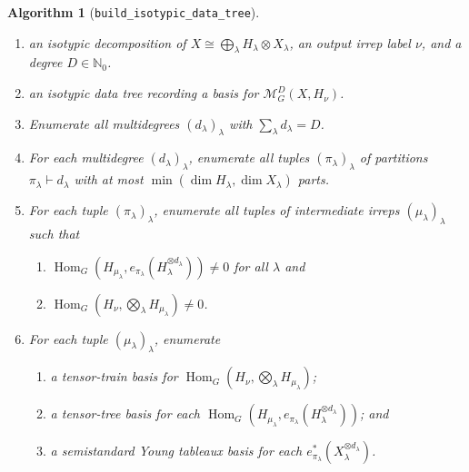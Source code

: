 \documentclass[11pt]{article}
\newcommand{\dsN}{\mathbb{N}}
\newcommand{\scM}{\mathcal{M}}
\newcommand{\HomG}[2]{\operatorname{Hom}_G\!\left(#1,#2\right)}
\newtheorem{algorithm}[theorem]{Algorithm}
\theoremstyle{definition}
\begin{document}
\begin{algorithm}[\texttt{build\_isotypic\_data\_tree}]\label{alg:build-isotypic-data-tree}

  \phantom{}

  \begin{enumerate}[label=\textbf{Step \arabic*.},ref=\arabic*,leftmargin=2.8cm]

    \item[\textbf{Input:}] an isotypic decomposition of $X\cong \bigoplus_\lambda H_\lambda\otimes X_\lambda$, an output irrep label $\nu$, and a degree $D \in \dsN_0$.

    \item[\textbf{Output:}] an isotypic data tree recording a basis for $\scM_G^D(X,H_\nu)$.

    \item \label{alg:build-isotypic-data-tree:step-multidegrees} Enumerate all multidegrees $(d_\lambda)_\lambda$ with $\sum_\lambda d_\lambda=D$.

    \item \label{alg:build-isotypic-data-tree:step-partitions} For each multidegree $(d_\lambda)_\lambda$, enumerate all tuples $(\pi_\lambda)_\lambda$ of partitions $\pi_\lambda\vdash d_\lambda$ with at most $\min(\dim H_\lambda,\dim X_\lambda)$ parts.

    \item \label{alg:build-isotypic-data-tree:step-intermediate-irreps} For each tuple $(\pi_\lambda)_\lambda$, enumerate all tuples of intermediate irreps $(\mu_\lambda)_\lambda$ such that
    \begin{enumerate}[label=\textup{(\alph*)},ref=\theenumi(\alph*),leftmargin=2.2em]
      \item \label{alg:build-isotypic-data-tree:step-schur-constituents} $\HomG{H_{\mu_\lambda}}{e_{\pi_\lambda}(H_\lambda^{\otimes d_\lambda})} \neq 0$ for all $\lambda$ and
      \item \label{alg:build-isotypic-data-tree:step-tensor-product-constituents} $\HomG{H_\nu}{\bigotimes_\lambda H_{\mu_\lambda}}\neq 0$.
    \end{enumerate}

    \item \label{alg:build-isotypic-data-tree:step-bases} For each tuple $(\mu_\lambda)_\lambda$, enumerate
    \begin{enumerate}[label=\textup{(\alph*)},ref=\theenumi(\alph*),leftmargin=2.2em]
      \item \label{alg:build-isotypic-data-tree:step-tensor-train-basis} a tensor-train basis for $\HomG{H_\nu}{\bigotimes_{\lambda} H_{\mu_\lambda}}$;
      \item \label{alg:build-isotypic-data-tree:step-schur-tensor-tree-basis} a tensor-tree basis for each $\HomG{H_{\mu_\lambda}}{e_{\pi_\lambda}(H_\lambda^{\otimes d_\lambda})}$; and
      \item \label{alg:build-isotypic-data-tree:step-ssyt-basis} a semistandard Young tableaux basis for each $e_{\pi_\lambda}^*(X_\lambda^{\otimes d_\lambda})$.
    \end{enumerate}
  \end{enumerate}
\end{algorithm}
\end{document}
